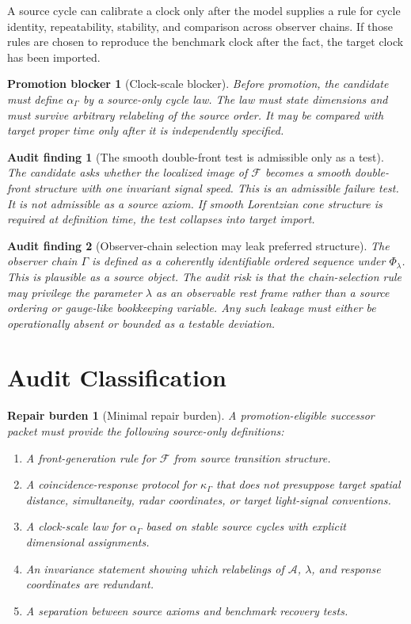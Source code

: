 \documentclass[11pt]{article}
\newcommand{\Sub}{\mathcal{A}}
\newcommand{\PhiFlow}{\Phi_{\lambda}}
\newcommand{\Front}{\mathcal{F}}
\newtheorem{auditfinding}{Audit finding}
\newtheorem{blocker}{Promotion blocker}
\newtheorem{repairburden}{Repair burden}
\begin{document}
A source cycle can calibrate a clock only after the model supplies a rule for
cycle identity, repeatability, stability, and comparison across observer
chains. If those rules are chosen to reproduce the benchmark clock after the
fact, the target clock has been imported.

\begin{blocker}[Clock-scale blocker]
Before promotion, the candidate must define \(\alpha_{\Gamma}\) by a
source-only cycle law. The law must state dimensions and must survive arbitrary
relabeling of the source order. It may be compared with target proper time only
after it is independently specified.
\end{blocker}

\begin{auditfinding}[The smooth double-front test is admissible only as a test]
The candidate asks whether the localized image of \(\Front\) becomes a smooth
double-front structure with one invariant signal speed. This is an admissible
failure test. It is not admissible as a source axiom. If smooth Lorentzian cone
structure is required at definition time, the test collapses into target
import.
\end{auditfinding}

\begin{auditfinding}[Observer-chain selection may leak preferred structure]
The observer chain \(\Gamma\) is defined as a coherently identifiable ordered
sequence under \(\PhiFlow\). This is plausible as a source object. The audit
risk is that the chain-selection rule may privilege the parameter \(\lambda\)
as an observable rest frame rather than a source ordering or gauge-like
bookkeeping variable. Any such leakage must either be operationally absent or
bounded as a testable deviation.
\end{auditfinding}

\section{Audit Classification}

\begin{repairburden}[Minimal repair burden]
A promotion-eligible successor packet must provide the following source-only
definitions:
\begin{enumerate}
    \item A front-generation rule for \(\Front\) from source transition
    structure.
    \item A coincidence-response protocol for \(\kappa_{\Gamma}\) that does
    not presuppose target spatial distance, simultaneity, radar coordinates,
    or target light-signal conventions.
    \item A clock-scale law for \(\alpha_{\Gamma}\) based on stable source
    cycles with explicit dimensional assignments.
    \item An invariance statement showing which relabelings of \(\Sub\),
    \(\lambda\), and response coordinates are redundant.
    \item A separation between source axioms and benchmark recovery tests.
\end{enumerate}
\end{repairburden}
\end{document}
